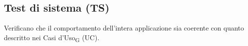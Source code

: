 %
%
\subsection{Test di sistema (TS)}
Verificano che il comportamento dell'intera applicazione sia coerente con quanto descritto nei Casi d'Uso\textsubscript{G} (UC).

